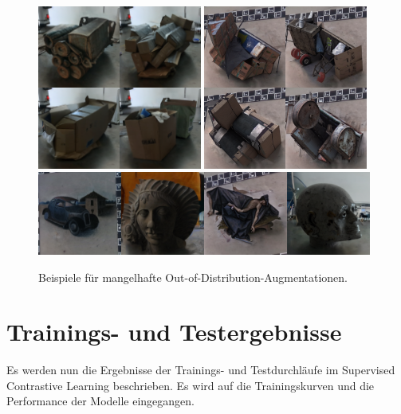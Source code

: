 \begin{figure}
	\centering
	\includegraphics[width=0.48\textwidth]{figure_results_ood-augs_bad_1.png}%
	\hspace{0.02\textwidth}\includegraphics[width=0.48\textwidth]{figure_results_ood-augs_bad_2.png}\vspace{0.01\textwidth}
	\includegraphics[width=0.98\textwidth]{figure_results_ood-augs_bad_4.png}
	\caption{Beispiele für mangelhafte Out-of-Distribution-Augmentationen.}
	\label{fig:ood-augs-bad}
\end{figure}

\section{Trainings- und Testergebnisse} \label{sec:supcon-results}

Es werden nun die Ergebnisse der Trainings- und Testdurchläufe im Supervised Contrastive Learning beschrieben. Es wird auf die Trainingskurven und die Performance der Modelle eingegangen.


